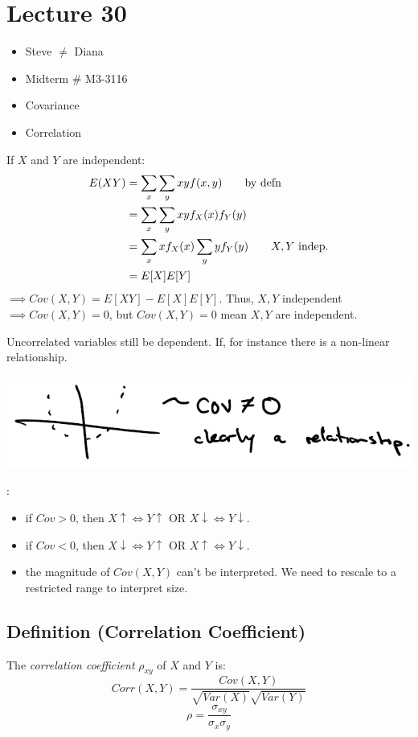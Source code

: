 \section{Lecture 30}
\begin{itemize}
    \item Steve $ \neq $ Diana
    \item Midterm \# M3-3116
    \item Covariance
    \item Correlation
\end{itemize}
If $ X $ and $ Y $ are independent:
\begin{align*}
    E(XY)&=
    \sum\limits_{x} \sum\limits_{y} xy f(x,y)\qquad\text{by defn}\\
    &= \sum\limits_{x} \sum\limits_{y} xyf_X(x)f_Y(y)\\
    &=\sum\limits_{x} xf_X(x) \sum\limits_{y} yf_Y(y)\qquad\text{$ X,Y $ indep.}\\
    &=E[X]E[Y]
\end{align*}
$ \implies Cov(X,Y)=E[XY]-E[X]E[Y] $. Thus, $ X,Y $ independent
$ \implies Cov(X,Y)=0 $, but $ Cov(X,Y) = 0 $ 
mean $ X,Y $ are independent.

Uncorrelated variables  still be dependent. If, for
instance there is a non-linear relationship.

\begin{center}
    \includegraphics{covnot0.png}
\end{center}

:
\begin{itemize}
    \item if $ Cov>0 $, then $ X\uparrow \iff Y\uparrow $ OR
    $ X\downarrow \iff Y\downarrow $.
    \item if $ Cov<0 $, then $ X\downarrow \iff Y\uparrow $ OR
    $ X\uparrow \iff Y\downarrow $.
    \item the magnitude of $ Cov(X,Y) $ can't be interpreted. We need
    to rescale to a restricted range to interpret size.
\end{itemize}

\begin{defbox}
    \subsection{Definition (Correlation Coefficient)}
    The \emph{correlation coefficient} $ \rho_{xy} $ of $ X $ and $ Y $ is:
    \[ Corr(X,Y)=\frac{Cov(X,Y)}{\sqrt{Var(X)}\sqrt{Var(Y)}} \]
    \[ \rho=\frac{\sigma_{xy}}{\sigma_x\sigma_y}  \]    
\end{defbox}

